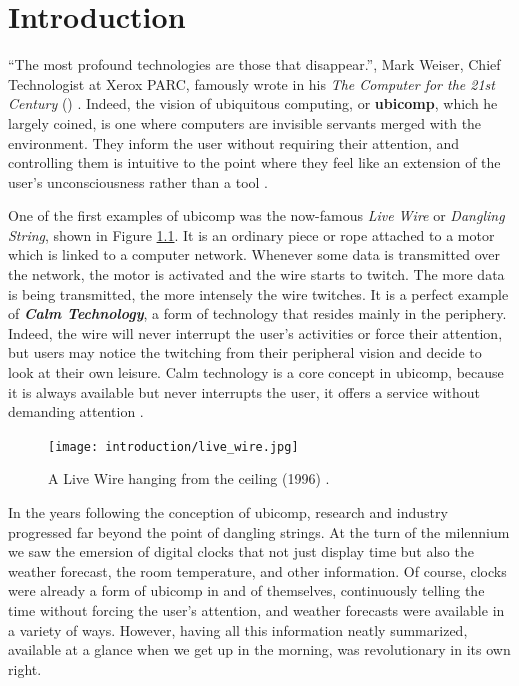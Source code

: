 \chapter{Introduction} \label{chap:intro}
``The most profound technologies are those that disappear.'', Mark Weiser, Chief Technologist at Xerox PARC, famously wrote in his \textit{The Computer for the 21st Century} (\citeyear{weiser1991computer}) \cite{weiser1991computer}. Indeed, the vision of ubiquitous computing, or \mbox{\textbf{ubicomp}}, which he largely coined, is one where computers are invisible servants merged with the environment. They inform the user without requiring their attention, and controlling them is intuitive to the point where they feel like an extension of the user's unconsciousness rather than a tool \cite{weiser1997coming}.

One of the first examples of ubicomp was the now-famous \textit{Live Wire} or \textit{Dangling String}, shown in Figure \ref{fig:live_wire}. It is an ordinary piece or rope attached to a motor which is linked to a computer network. Whenever some data is transmitted over the network, the motor is activated and the wire starts to twitch. The more data is being transmitted, the more intensely the wire twitches. It is a perfect example of \textit{\textbf{Calm Technology}}, a form of technology that resides mainly in the periphery. Indeed, the wire will never interrupt the user's activities or force their attention, but users may notice the twitching from their peripheral vision and decide to look at their own leisure. Calm technology is a core concept in ubicomp, because it is always available but never interrupts the user, it offers a service without demanding attention \cite{weiser1996designing}.

\begin{figure}
    \centering
    \texttt{[image: introduction/live\_wire.jpg]}
    \caption{A Live Wire hanging from the ceiling (1996) \cite{weiser1996designing}.}
    \label{fig:live_wire}
\end{figure}

In the years following the conception of ubicomp, research and industry progressed far beyond the point of dangling strings. At the turn of the milennium we saw the emersion of digital clocks that not just display time but also the weather forecast, the room temperature, and other information. Of course, clocks were already a form of ubicomp in and of themselves, continuously telling the time without forcing the user's attention, and weather forecasts were available in a variety of ways. However, having all this information neatly summarized, available at a glance when we get up in the morning, was revolutionary in its own right.

